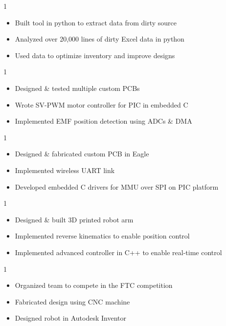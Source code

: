 \documentclass[10pt, letterpaper, ragged2e, withhyper]{AltaCV/altacv}
\def\RSDATA{0}		%
\def\CSMBLDC{1}		%
\def\CSMQUAD{0}		%
\def\LSROBO{0}		%
\def\FTCROBO{0}		%
\begin{document}
\begin{paracol}{2}
\if\RSDATA1

\divider

\begin{itemize}
\item Built tool in python to extract data from dirty source
\item Analyzed over 20,000 lines of dirty Excel data in python
\item Used data to optimize inventory and improve designs
\end{itemize}
\fi

\if\CSMBLDC1
\divider
{}
\begin{itemize}
\item Designed \& tested multiple custom PCBs
\item Wrote SV-PWM motor controller for PIC in embedded C
\item Implemented EMF position detection using ADCs \& DMA
\end{itemize}
\fi

\if\CSMQUAD1
\divider
{}
\begin{itemize}
\item Designed \& fabricated custom PCB in Eagle
\item Implemented wireless UART link
\item Developed embedded C drivers for MMU over SPI on PIC platform
\end{itemize}
\fi

\if\LSROBO1
\divider

\begin{itemize}
\item Designed \& built 3D printed robot arm
\item Implemented reverse kinematics to enable position control
\item Implemented advanced controller in C++ to enable real-time control
\end{itemize}
\fi

\if\FTCROBO1

\divider

\begin{itemize}
\item Organized team to compete in the FTC competition
\item Fabricated design using CNC machine
\item Designed robot in Autodesk Inventor
\end{itemize}
\fi


\end{paracol}
\end{document}

